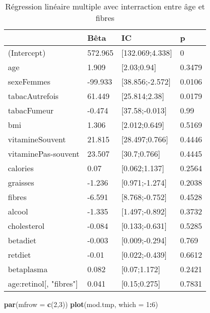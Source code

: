 \documentclass[]{article}
\newenvironment{Shaded}{\begin{snugshade}}{\end{snugshade}}
\newcommand{\KeywordTok}[1]{\textcolor[rgb]{0.13,0.29,0.53}{\textbf{#1}}}
\newcommand{\DataTypeTok}[1]{\textcolor[rgb]{0.13,0.29,0.53}{#1}}
\newcommand{\DecValTok}[1]{\textcolor[rgb]{0.00,0.00,0.81}{#1}}
\newcommand{\OperatorTok}[1]{\textcolor[rgb]{0.81,0.36,0.00}{\textbf{#1}}}
\newcommand{\NormalTok}[1]{#1}
\begin{document}
\begin{table}

\caption{\label{tab:unnamed-chunk-54}Régression linéaire multiple avec interraction entre âge et fibres}
\centering
\begin{tabular}[t]{l|l|l|l}
\hline
  & Bêta & IC & p\\
\hline
\rowcolor[HTML]{BBD2E1}  (Intercept) & 572.965 & [132.069;4.338] & 0\\
\hline
age & 1.909 & [2.03;0.94] & 0.3479\\
\hline
\rowcolor[HTML]{BBD2E1}  sexeFemmes & -99.933 & [38.856;-2.572] & 0.0106\\
\hline
tabacAutrefois & 61.449 & [25.814;2.38] & 0.0179\\
\hline
\rowcolor[HTML]{BBD2E1}  tabacFumeur & -0.474 & [37.58;-0.013] & 0.99\\
\hline
bmi & 1.306 & [2.012;0.649] & 0.5169\\
\hline
\rowcolor[HTML]{BBD2E1}  vitamineSouvent & 21.815 & [28.497;0.766] & 0.4446\\
\hline
vitaminePas-souvent & 23.507 & [30.7;0.766] & 0.4445\\
\hline
\rowcolor[HTML]{BBD2E1}  calories & 0.07 & [0.062;1.137] & 0.2564\\
\hline
graisses & -1.236 & [0.971;-1.274] & 0.2038\\
\hline
\rowcolor[HTML]{BBD2E1}  fibres & -6.591 & [8.768;-0.752] & 0.4528\\
\hline
alcool & -1.335 & [1.497;-0.892] & 0.3732\\
\hline
\rowcolor[HTML]{BBD2E1}  cholesterol & -0.084 & [0.133;-0.631] & 0.5285\\
\hline
betadiet & -0.003 & [0.009;-0.294] & 0.769\\
\hline
\rowcolor[HTML]{BBD2E1}  retdiet & -0.01 & [0.022;-0.439] & 0.6612\\
\hline
betaplasma & 0.082 & [0.07;1.172] & 0.2421\\
\hline
\rowcolor[HTML]{BBD2E1}  age:retinol[, "fibres"] & 0.041 & [0.15;0.275] & 0.7831\\
\hline
\end{tabular}
\end{table}

\begin{Shaded}
\begin{Highlighting}[]
\KeywordTok{par}\NormalTok{(}\DataTypeTok{mfrow =} \KeywordTok{c}\NormalTok{(}\DecValTok{2}\NormalTok{,}\DecValTok{3}\NormalTok{))}
\KeywordTok{plot}\NormalTok{(mod.tmp, }\DataTypeTok{which =} \DecValTok{1}\OperatorTok{:}\DecValTok{6}\NormalTok{)}
\end{Highlighting}
\end{Shaded}
\end{document}
